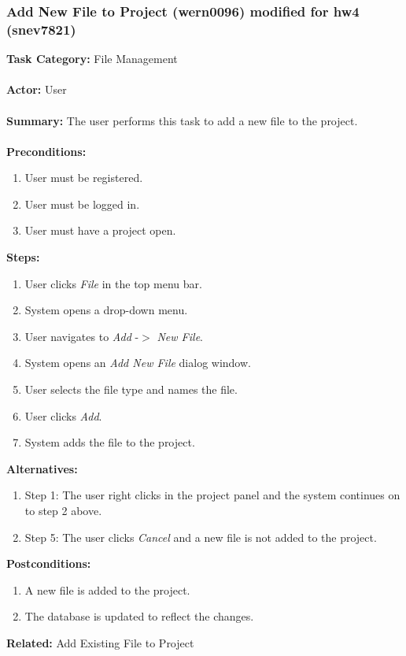 \documentclass[11pt]{report}
\begin{document}
\newpage




\subsubsection{Add New File to Project (wern0096) modified for hw4 (snev7821)}
\begin{framed}

	\textbf{Task Category:} File Management \\ \\
	\textbf{Actor:} User \\ \\
	\textbf{Summary:} The user performs this task to add a new file to the project. \\ \\
	\textbf{Preconditions:} 
	\begin{enumerate}
		\item User must be registered.
		\item User must be logged in.
		\item User must have a project open.
	\end{enumerate}
	\textbf{Steps:}
	\begin{enumerate}
		\item User clicks \textit{File} in the top menu bar.
		\item System opens a drop-down menu.
		\item User navigates to \textit{Add} -$>$ \textit{New File}.
		\item System opens an \textit{Add New File} dialog window.
		\item User selects the file type and names the file.
		\item User clicks \textit{Add}.
		\item System adds the file to the project.
	\end{enumerate}
	\textbf{Alternatives:} 
	\begin{enumerate}
		\item Step 1: The user right clicks in the project panel and the system continues on to step 2 above.
		\item Step 5: The user clicks \textit{Cancel} and a new file is not added to the project.
	\end{enumerate}
	\textbf{Postconditions:}
	\begin{enumerate}
		\item A new file is added to the project.
		\item The database is updated to reflect the changes.
	\end{enumerate}
	\textbf{Related:} Add Existing File to Project
\end{framed} 
\end{document}
